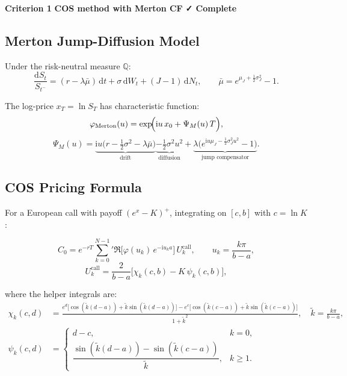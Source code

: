 \documentclass[12pt, a4paper]{article}
\theoremstyle{definition}
\newcommand{\Q}{\mathbb{Q}}
\newcommand{\ii}{\mathrm{i}}
\newcommand{\dd}{\mathrm{d}}
\newcommand{\crit}[2]{%
  \noindent\colorbox{#1!15}{\color{#1}\textbf{Criterion #2}}\quad}
\begin{document}
\crit{critgreen}{1} \textbf{COS method with Merton CF} \hfill \textcolor{critgreen}{\textbf{✓ Complete}}

\subsection{Merton Jump-Diffusion Model}

Under the risk-neutral measure $\Q$:
\begin{equation}
  \frac{\dd S_t}{S_{t^-}}
  = (r - \lambda\bar\mu)\,\dd t + \sigma\,\dd W_t + (J-1)\,\dd N_t,
  \qquad \bar\mu = e^{\mu_J + \frac{1}{2}\sigma_J^2}-1.
\end{equation}

The log-price $x_T = \ln S_T$ has characteristic function:
\begin{equation}\label{eq:merton_cf}
  \varphi_{\text{Merton}}(u) = \exp\!\Bigl(\ii u\,x_0 + \Psi_M(u)\,T\Bigr),
\end{equation}
\begin{equation}
  \Psi_M(u)
    = \underbrace{\ii u\bigl(r-\tfrac{1}{2}\sigma^2-\lambda\bar\mu\bigr)}_{\text{drift}}
      \underbrace{-\tfrac{1}{2}\sigma^2 u^2}_{\text{diffusion}}
      + \underbrace{\lambda\bigl(e^{\ii u\mu_J - \frac{1}{2}\sigma_J^2 u^2}-1\bigr)}_{\text{jump compensator}}.
\end{equation}

\subsection{COS Pricing Formula}

For a European call with payoff $(e^{x}-K)^+$, integrating on $[c,b]$ with $c=\ln K$:

\begin{equation}\label{eq:cos_call}
  C_0 = e^{-rT}\sum_{k=0}^{N-1}{}'
        \Re\!\bigl[\varphi(u_k)\,e^{-\ii u_k a}\bigr]\,U_k^{\text{call}},
  \qquad u_k = \frac{k\pi}{b-a},
\end{equation}
\begin{equation}
  U_k^{\text{call}} = \frac{2}{b-a}\bigl[\chi_k(c,b) - K\,\psi_k(c,b)\bigr],
\end{equation}

where the helper integrals are:
\begin{align}
  \chi_k(c,d) &= \frac{e^d\bigl[\cos(\tilde k(d-a))+\tilde k\sin(\tilde k(d-a))\bigr]
                       -e^c\bigl[\cos(\tilde k(c-a))+\tilde k\sin(\tilde k(c-a))\bigr]}
                      {1+\tilde k^2},
                \quad \tilde k=\frac{k\pi}{b-a},\\[4pt]
  \psi_k(c,d) &= \begin{cases}d-c,& k=0,\\[3pt]
    \dfrac{\sin(\tilde k(d-a))-\sin(\tilde k(c-a))}{\tilde k},& k\geq 1.\end{cases}
\end{align}
\end{document}

